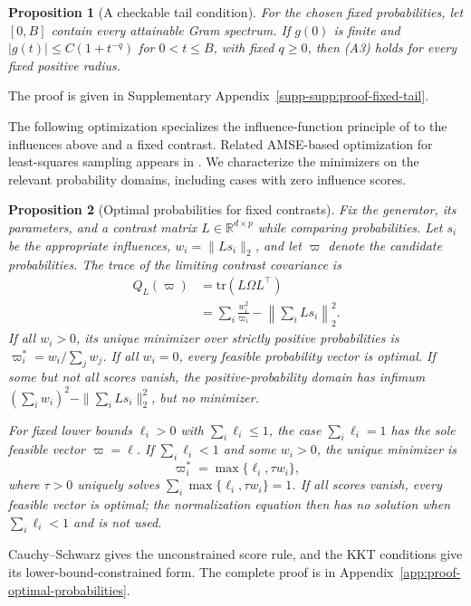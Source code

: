 \documentclass[pdflatex,iicol,sn-mathphys-ay]{sn-jnl}
\theoremstyle{thmstyleone}
\newtheorem{proposition}{Proposition}
\theoremstyle{thmstylethree}
\theoremstyle{thmstyletwo}
\newcommand{\RR}{\mathbb{R}}
\newcommand{\tr}{\mathrm{tr}}
\begin{document}
\begin{proposition}[A checkable tail condition]\label{prop:fixed_tail_growth}
For the chosen fixed probabilities, let $[0,B]$ contain every attainable
Gram spectrum. If $g(0)$ is finite and
$|g(t)|\le C(1+t^{-q})$ for $0<t\le B$, with fixed $q\ge0$, then (A3)
holds for every fixed positive radius.
\end{proposition}
The proof is given in Supplementary Appendix~\ref{supp-supp:proof-fixed-tail}.

The following optimization specializes the influence-function principle of
\citet{ting2018optimal} to the influences above and a fixed
contrast. Related AMSE-based optimization for least-squares sampling appears
in \citet{ma2022asymptotic}. We characterize the minimizers on the relevant
probability domains, including cases with zero influence scores.

\begin{proposition}[Optimal probabilities for fixed contrasts]
\label{prop:optimal_probabilities}
Fix the generator, its parameters, and a contrast matrix $L\in\RR^{d\times p}$
while comparing probabilities. Let $s_i$ be the appropriate influences,
$w_i=\|Ls_i\|_2$, and let $\varpi$ denote the candidate probabilities.
The trace of the limiting contrast covariance is
\[
 \begin{aligned}
 Q_L(\varpi)&=\tr(L\Omega L^\top)\\
   &=\sum_i\frac{w_i^2}{\varpi_i}-\left\|\sum_i Ls_i\right\|_2^2.
 \end{aligned}
\]
If all $w_i>0$, its unique minimizer over strictly positive probabilities
is $\varpi_i^*=w_i/\sum_jw_j$.
If all $w_i=0$, every feasible probability vector is optimal.
If some but not all scores vanish, the positive-probability domain has
infimum $(\sum_iw_i)^2-\|\sum_iLs_i\|_2^2$, but no minimizer.

For fixed lower bounds $\ell_i>0$ with $\sum_i\ell_i\le1$,
the case $\sum_i\ell_i=1$ has the sole feasible vector $\varpi=\ell$.
If $\sum_i\ell_i<1$ and some $w_i>0$, the unique minimizer is
\[
 \varpi_i^*=\max\{\ell_i,\tau w_i\},
\]
where $\tau>0$ uniquely solves $\sum_i\max\{\ell_i,\tau w_i\}=1$.
If all scores vanish, every feasible vector is
optimal; the normalization equation then has no solution when
$\sum_i\ell_i<1$ and is not used.
\end{proposition}
Cauchy--Schwarz gives the unconstrained score rule, and the KKT conditions
give its lower-bound-constrained form. The complete proof is in
Appendix~\ref{app:proof-optimal-probabilities}.
\end{document}
